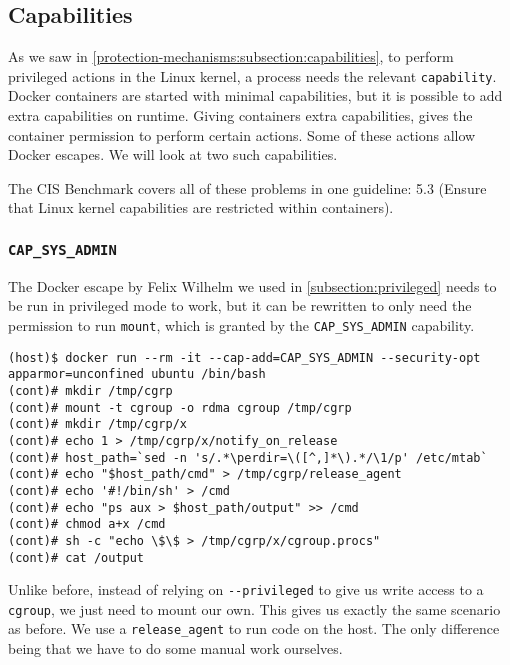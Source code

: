 \subsection{Capabilities}\label{misconfigurations:subsection:capabilities}
As we saw in \autoref{protection-mechanisms:subsection:capabilities}, to perform privileged actions in the Linux kernel, a process needs the relevant \lstinline{capability}. Docker containers are started with minimal capabilities, but it is possible to add extra capabilities on runtime. Giving containers extra capabilities, gives the container permission to perform certain actions. Some of these actions allow Docker escapes. We will look at two such capabilities.

\medskip

The CIS Benchmark covers all of these problems in one guideline: 5.3 (Ensure that Linux kernel capabilities are restricted within containers).

\subsubsection{\texorpdfstring{\lstinline{CAP_SYS_ADMIN}}{CAP SYS ADMIN}}
The Docker escape by Felix Wilhelm\cite{Felix-Wilhem-Tweet} we used in \autoref{subsection:privileged} needs to be run in privileged mode to work, but it can be rewritten to only need the permission to run \lstinline{mount}\cite{TrailOfBits-Docker-Escape}, which is granted by the \lstinline{CAP_SYS_ADMIN} capability.

\begin{lstlisting}[caption={Docker escape using \lstinline{CAP_SYS_ADMIN}.},captionpos=b]
(host)$ docker run --rm -it --cap-add=CAP_SYS_ADMIN --security-opt apparmor=unconfined ubuntu /bin/bash
(cont)# mkdir /tmp/cgrp
(cont)# mount -t cgroup -o rdma cgroup /tmp/cgrp
(cont)# mkdir /tmp/cgrp/x
(cont)# echo 1 > /tmp/cgrp/x/notify_on_release
(cont)# host_path=`sed -n 's/.*\perdir=\([^,]*\).*/\1/p' /etc/mtab`
(cont)# echo "$host_path/cmd" > /tmp/cgrp/release_agent
(cont)# echo '#!/bin/sh' > /cmd
(cont)# echo "ps aux > $host_path/output" >> /cmd
(cont)# chmod a+x /cmd
(cont)# sh -c "echo \$\$ > /tmp/cgrp/x/cgroup.procs"
(cont)# cat /output
\end{lstlisting}

Unlike before, instead of relying on \lstinline{--privileged} to give us write access to a \lstinline{cgroup}, we just need to mount our own. This gives us exactly the same scenario as before. We use a \lstinline{release_agent} to run code on the host. The only difference being that we have to do some manual work ourselves.

